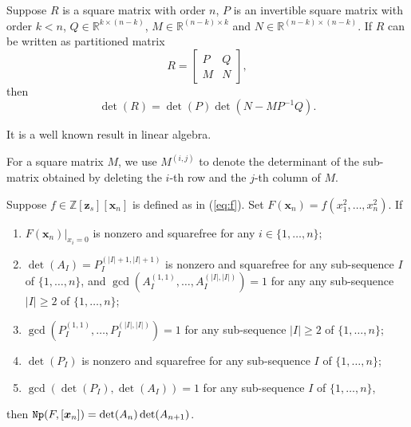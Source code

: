 \documentclass[amsthm]{elsart}
\def  \Nproj {{\tt Np}}
\def \RR {{\mathbb R}}
\def \ZZ {{\mathbb Z}}
\newcommand{\xx}{\bm{x}}
\newcommand{\zz}{\bm{z}}
\begin{document}
\begin{lem}\label{lem:matrix}
  Suppose $R$ is a square matrix with order $n$, $P$ is an invertible  square matrix with order $k<n$, $Q\in \RR^{k\times (n-k)}$, $M\in \RR^{(n-k)\times k }$ and $N\in \RR^{(n-k)\times (n-k) }$. If $R$ can be written as partitioned matrix
  $$R=\begin{bmatrix} P & Q \\ M & N \end{bmatrix},$$ then
  $$\det(R)=\det(P)\det(N-MP^{-1}Q).$$
\end{lem}
\begin{pf}
  It is a well known result in linear algebra.
\end{pf}
For a square matrix $M$, we use $M^{(i,j)}$ to denote the determinant of the sub-matrix obtained by deleting the $i$-th row and the $j$-th column of $M$.
\begin{thm}
  \label{thm:cop}
Suppose $f\in\ZZ[\zz_s][\xx_n]$ is defined as in (\ref{eq:f}). Set $F(\xx_n)=f(x_1^2,\ldots,x_n^2)$. If
  \begin{enumerate}
  \item $F(\xx_n)|_{x_i=0} $ is nonzero and squarefree for any $i\in \{1,\dots,n\}$;
  \item $\det(A_I)=P_{I}^{(|I|+1,|I|+1)}$ is nonzero and squarefree for any sub-sequence $I$ of $\{1,\ldots,n \}$, and $\gcd(A_{I}^{(1,1)},\dots,A_{I}^{(|I|,|I|)})=1$ for any any sub-sequence $|I|\ge2$ of $\{1,\ldots,n \}$;
\item  $\gcd(P_{I}^{(1,1)},\dots,P_{I}^{(|I|,|I|)})=1$ for any sub-sequence $|I|\ge2$ of $\{1,\ldots,n \} $;
  \item $\det(P_{I})$ is nonzero and squarefree for any sub-sequence $I$ of $\{1,\ldots,n \}$;
  \item $\gcd(\det(P_{I}),\det(A_{I}))=1$ for any sub-sequence $I$ of $\{1,\ldots,n\}$,
  \end{enumerate}
  then $\Nproj(F,[\xx_n])=\det(A_{n})\det(A_{n+1})$. \end{thm}
\end{document}
